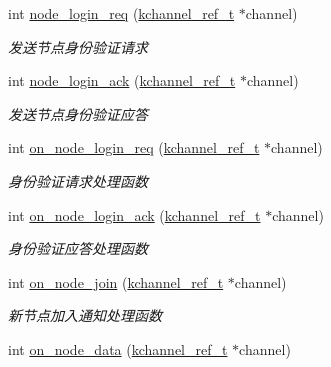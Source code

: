 \begin{DoxyCompactItemize}
int \hyperlink{a00101_aa64e385bd42b4b6fe72cfcd137a99fe2_aa64e385bd42b4b6fe72cfcd137a99fe2}{node\+\_\+login\+\_\+req} (\hyperlink{a00066_a3b7e82599367eade261456f60ebe2cd9_a3b7e82599367eade261456f60ebe2cd9}{kchannel\+\_\+ref\+\_\+t} $\ast$channel)
\begin{DoxyCompactList}\small\item\em 发送节点身份验证请求 \end{DoxyCompactList}\item 
int \hyperlink{a00101_a43805096b878b93a1118eabd0a5f9799_a43805096b878b93a1118eabd0a5f9799}{node\+\_\+login\+\_\+ack} (\hyperlink{a00066_a3b7e82599367eade261456f60ebe2cd9_a3b7e82599367eade261456f60ebe2cd9}{kchannel\+\_\+ref\+\_\+t} $\ast$channel)
\begin{DoxyCompactList}\small\item\em 发送节点身份验证应答 \end{DoxyCompactList}\item 
int \hyperlink{a00101_a8265131106d1be7979dbe768f90201b2_a8265131106d1be7979dbe768f90201b2}{on\+\_\+node\+\_\+login\+\_\+req} (\hyperlink{a00066_a3b7e82599367eade261456f60ebe2cd9_a3b7e82599367eade261456f60ebe2cd9}{kchannel\+\_\+ref\+\_\+t} $\ast$channel)
\begin{DoxyCompactList}\small\item\em 身份验证请求处理函数 \end{DoxyCompactList}\item 
int \hyperlink{a00101_a631409526fc946adb7f023a17d33cbae_a631409526fc946adb7f023a17d33cbae}{on\+\_\+node\+\_\+login\+\_\+ack} (\hyperlink{a00066_a3b7e82599367eade261456f60ebe2cd9_a3b7e82599367eade261456f60ebe2cd9}{kchannel\+\_\+ref\+\_\+t} $\ast$channel)
\begin{DoxyCompactList}\small\item\em 身份验证应答处理函数 \end{DoxyCompactList}\item 
int \hyperlink{a00101_a97868db78a1ce888063dbd4709d2896b_a97868db78a1ce888063dbd4709d2896b}{on\+\_\+node\+\_\+join} (\hyperlink{a00066_a3b7e82599367eade261456f60ebe2cd9_a3b7e82599367eade261456f60ebe2cd9}{kchannel\+\_\+ref\+\_\+t} $\ast$channel)
\begin{DoxyCompactList}\small\item\em 新节点加入通知处理函数 \end{DoxyCompactList}\item 
int \hyperlink{a00101_a32e1b1f54cd73d3cde296efe5bc9c39a_a32e1b1f54cd73d3cde296efe5bc9c39a}{on\+\_\+node\+\_\+data} (\hyperlink{a00066_a3b7e82599367eade261456f60ebe2cd9_a3b7e82599367eade261456f60ebe2cd9}{kchannel\+\_\+ref\+\_\+t} $\ast$channel)

\end{DoxyCompactItemize}
